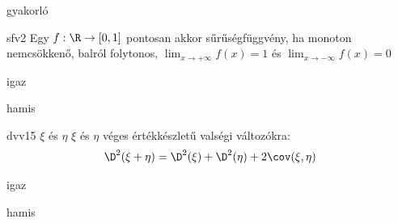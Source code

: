 \documentclass[12pt]{article}
\begin{document}
\begin{quiz}{gyakorló}
\begin{multi}[feedback={Def.}]{sfv2}
Egy $f:\R\to [0,1]$ pontosan akkor sűrűségfüggvény, ha monoton nemcsökkenő, 
balról folytonos, $\lim_{x\to+\infty}f(x)=1$ és $\lim_{x\to-\infty}f(x)=0$
\item igaz
\item* hamis
\end{multi}
\begin{multi}[feedback={Tétel. Ez tetszőleges v.v-kre is igaz.}]{dvv15}
$\xi$ és $\eta$ $\xi$ és $\eta$ véges értékkészletű valségi változókra:
$$
\D^2(\xi+\eta)=\D^2(\xi)+\D^2(\eta)+2\cov(\xi,\eta)
$$
\item* igaz
\item hamis
\end{multi}
\end{quiz}
\end{document}
